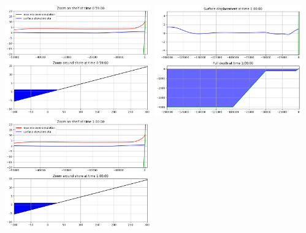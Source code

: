 \documentclass[11pt]{article}
\begin{document}
\includegraphics[width=0.475\textwidth]{frame0059fig1.png}
\vskip 10pt 
\includegraphics[width=0.475\textwidth]{frame0060fig0.png}
\includegraphics[width=0.475\textwidth]{frame0060fig1.png}
\end{document}
